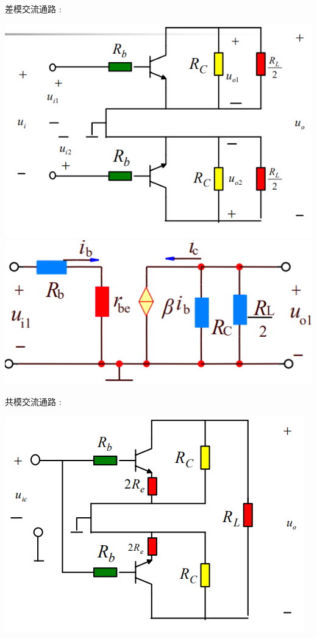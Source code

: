 \documentclass[UTF8, 12pt]{ctexart}
\begin{document}
	差模交流通路 :

	\includegraphics[scale = 0.4]{03/长尾式差分放大电路差模输入交流通路.png} \includegraphics[scale = 0.4]{03/长尾式差分放大电路差模输入交流通路(2).png}

	共模交流通路 :

	\includegraphics[scale = 0.4]{03/长尾式差分放大电路共模输入交流通路.png} 
\end{document}
